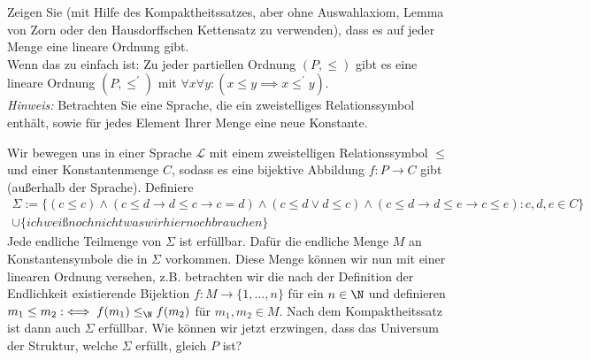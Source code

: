 
\begin{exercise}[133]

Zeigen Sie (mit Hilfe des Kompaktheitssatzes, aber ohne Auswahlaxiom, Lemma von Zorn
oder den Hausdorffschen Kettensatz zu verwenden), dass es auf jeder Menge eine
lineare Ordnung gibt. \\
Wenn das zu einfach ist: Zu jeder partiellen Ordnung $(P,\leq)$ gibt es eine
lineare Ordnung $(P,\leq^{\prime})$ mit $\forall x \forall y: (x \leq y \implies x \leq^{\prime} y)$. \\
\textit{Hinweis:} Betrachten Sie eine Sprache, die ein zweistelliges Relationssymbol
enthält, sowie für jedes Element Ihrer Menge eine neue Konstante.

\end{exercise}


\begin{solution}

Wir bewegen uns in einer Sprache $\mathscr{L}$ mit einem zweistelligen Relationssymbol $\leq$
und einer Konstantenmenge $C$, sodass es eine bijektive Abbildung $f: P \to C$ gibt (außerhalb der Sprache). Definiere
\begin{align*}
  \Sigma := \{(c \leq c) \land
  (c \leq d \rightarrow d \leq c \rightarrow c = d) \land
  (c \leq d \lor d \leq c) \land
  (c \leq d \rightarrow d \leq e \rightarrow c \leq e): c,d,e \in C\} \\
  \cup \{ich weiß noch nicht was wir hier noch brauchen\}
\end{align*}
Jede endliche Teilmenge von $\Sigma$ ist erfüllbar. Dafür die endliche Menge $M$
an Konstantensymbole die in $\Sigma$ vorkommen. Diese Menge können wir nun mit
einer linearen Ordnung versehen, z.B. betrachten wir die nach der Definition der
Endlichkeit existierende Bijektion $f: M \to \{1,\dots,n\}$ für ein $n \in \N$ und
definieren $m_1 \leq m_2:\iff f(m_1) \leq_\N f(m_2)$ für $m_1,m_2 \in M$.
Nach dem Kompaktheitssatz ist dann auch $\Sigma$ erfüllbar.
Wie können wir jetzt erzwingen, dass das Universum der Struktur, welche $\Sigma$
erfüllt, gleich $P$ ist?

\end{solution}


